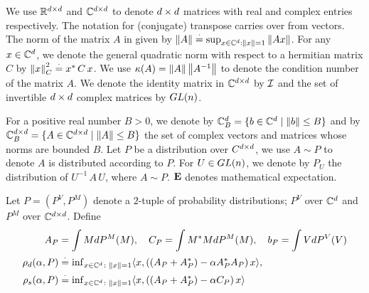 We use $\mathbb{R}^{d \times d}$ and $\mathbb{C}^{d \times d}$ to denote $d \times d$ matrices with real and complex entries respectively. The notation for (conjugate) transpose carries over from vectors.
The norm of the matrix $A$ in given by $\left\| A\right\|\stackrel{\cdot}{=} \sup_{x\in \mathbb{C}^d:\left\| x\right\|=1} \left\| Ax\right\|$. For any $x\in\mathbb{C}^d$, we denote the general quadratic norm with respect to a hermitian matrix $C$ by $\left\| x\right\|^2_C\stackrel{\cdot}{=} x^*\, C \,x$. We use $\kappa(A)=\left\| A\right\|\left\| A^{-1}\right\|$ to denote the condition number of the matrix $A$. We denote the identity matrix in $\mathbb{C}^{d \times d}$ by $\mathcal{I}$ and the set of invertible $d \times d$ complex matrices by $GL(n)$.
\begin{comment}
We use $A\succeq 0$ to denote that the
square matrix $A$ is hermitian and positive semidefinite (HPD):
$A = A^*$, $\inf_x x^* A x\ge 0$.
For $A,B$ HPD matrices, $A\succeq B$ holds if $A-B\succeq 0$.
We also use $A\succ B$ similarly to denote that $A-B \succ 0$.
We also use $\preceq$ and $\prec$ analogously.
\end{comment}
For a positive real number $B>0$, we denote by $\mathbb{C}^{d}_B=\{b\in \mathbb{C}^d\mid \left\| b\right\|\leq B\}$ and by $\mathbb{C}^{d \times d}_B=\{A\in \mathbb{C}^{d \times d}\mid \left\| A\right\|\leq B\}$ the set of complex vectors and matrices whose norms are bounded $B$.
Let $P$ be a distribution over $C^{d \times d}$, we use $A\sim P$ to denote $A$ is distributed according to $P$. For $U\in GL(n)$, we denote by $P_U$ the distribution of $U^{-1}\,A\,U$, where $A\sim P$. $\mathbf{E}$ denotes mathematical expectation.
\begin{comment}
 We use $A\sim P$ to denote the fact that the random variable $A$ is distributed according to distribution $P$. Let the random matrix $A\sim P$, and $U\in \gln$, we use $P_U$ to denote the distribution of the random matrix $U^{-1}A U$.
\end{comment}
\begin{definition}\label{def:dist}
Let $P=(P^V,P^M)$ denote a $2$-tuple of probability distributions; $P^V$ over $\mathbb{C}^{d}$ and $P^M$ over $\mathbb{C}^{d \times d}$. Define
\begin{align*}
A_P&=\int M dP^M(M),\quad C_P=\int M^* M dP^M(M), \quad b_P=\int V dP^V(V)\\
\rho_d(\alpha,P)&\stackrel{\cdot}{=} {\inf}_{x\in\mathbb{C}^d\colon\left\| x\right\|=1}\langle x,\left((A_P+A_P^*)-\alpha A_P^* A_P\right)x\rangle,\\ \rho_s(\alpha,P)&\stackrel{\cdot}{=}{\inf}_{x\in \mathbb{C}^d\colon\left\| x\right\|=1}\langle x,\left((A_P+A_P^*)-\alpha C_P\right)x\rangle
\end{align*}
\end{definition}
